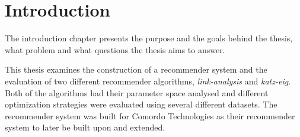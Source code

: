 
\section{Introduction}\label{sec:intro:intro}

The introduction chapter presents the purpose and the goals behind the thesis, what problem and what questions the thesis aims to answer.

This thesis examines the construction of a recommender system and the evaluation of two different recommender algorithms, \textit{link-analysis} and \textit{katz-eig}. Both of the algorithms had their parameter space analysed and different optimization strategies were evaluated using several different datasets. The recommender system was built for Comordo Technologies as their recommender system to later be built upon and extended.


